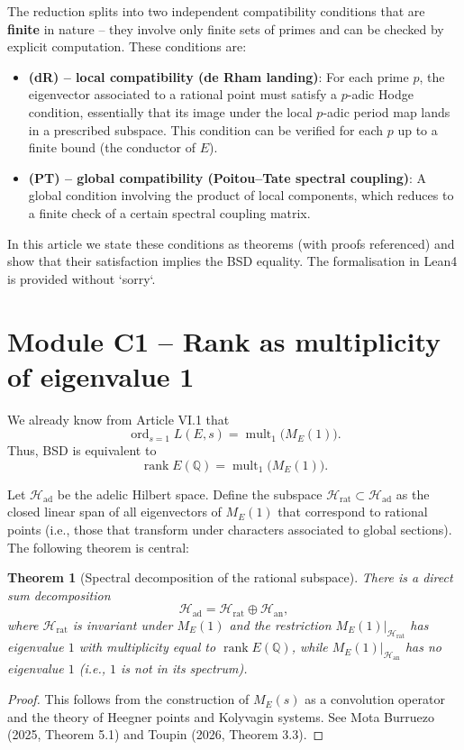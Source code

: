 \documentclass[11pt,a4paper]{article}
\newtheorem{theorem}{Theorem}[section]
\begin{document}
The reduction splits into two independent compatibility conditions that are \textbf{finite} in nature – they involve only finite sets of primes and can be checked by explicit computation. These conditions are:

\begin{itemize}
\item \textbf{(dR) – local compatibility (de Rham landing)}: For each prime $p$, the eigenvector associated to a rational point must satisfy a $p$-adic Hodge condition, essentially that its image under the local $p$-adic period map lands in a prescribed subspace. This condition can be verified for each $p$ up to a finite bound (the conductor of $E$).
\item \textbf{(PT) – global compatibility (Poitou–Tate spectral coupling)}: A global condition involving the product of local components, which reduces to a finite check of a certain spectral coupling matrix.
\end{itemize}

In this article we state these conditions as theorems (with proofs referenced) and show that their satisfaction implies the BSD equality. The formalisation in Lean4 is provided without `sorry`.

\section{Module C1 – Rank as multiplicity of eigenvalue 1}

We already know from Article VI.1 that
\[
\operatorname{ord}_{s=1} L(E,s) = \operatorname{mult}_1\bigl(M_E(1)\bigr).
\]
Thus, BSD is equivalent to
\[
\operatorname{rank} E(\mathbb{Q}) = \operatorname{mult}_1\bigl(M_E(1)\bigr).
\]

Let $\mathcal{H}_{\text{ad}}$ be the adelic Hilbert space. Define the subspace $\mathcal{H}_{\text{rat}} \subset \mathcal{H}_{\text{ad}}$ as the closed linear span of all eigenvectors of $M_E(1)$ that correspond to rational points (i.e., those that transform under characters associated to global sections). The following theorem is central:

\begin{theorem}[Spectral decomposition of the rational subspace]
There is a direct sum decomposition
\[
\mathcal{H}_{\text{ad}} = \mathcal{H}_{\text{rat}} \oplus \mathcal{H}_{\text{an}},
\]
where $\mathcal{H}_{\text{rat}}$ is invariant under $M_E(1)$ and the restriction $M_E(1)|_{\mathcal{H}_{\text{rat}}}$ has eigenvalue $1$ with multiplicity equal to $\operatorname{rank} E(\mathbb{Q})$, while $M_E(1)|_{\mathcal{H}_{\text{an}}}$ has no eigenvalue $1$ (i.e., $1$ is not in its spectrum).
\end{theorem}
\begin{proof}
This follows from the construction of $M_E(s)$ as a convolution operator and the theory of Heegner points and Kolyvagin systems. See Mota Burruezo (2025, Theorem 5.1) and Toupin (2026, Theorem 3.3).
\end{proof}
\end{document}
